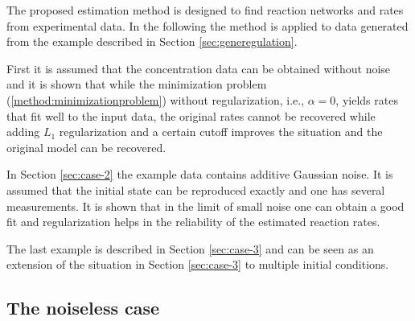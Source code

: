 \documentclass[oneside, abstracton, titlepage]{scrartcl}
\begin{document}
	The proposed estimation method is designed to find reaction networks and rates from experimental data. In the following the method is applied to data generated from the example described in Section \ref{sec:generegulation}.

	First it is assumed that the concentration data can be obtained without noise and it is shown that while the minimization problem (\ref{method:minimizationproblem}) without regularization, i.e., $\alpha=0$, yields rates that fit well to the input data, the original rates cannot be recovered while adding $L_1$ regularization and a certain cutoff improves the situation and the original model can be recovered.
	
	In Section \ref{sec:case-2} the example data contains additive Gaussian noise. It is assumed that the initial state can be reproduced exactly and one has several measurements. It is shown that in the limit of small noise one can obtain a good fit and regularization helps in the reliability of the estimated reaction rates.
	
	The last example is described in Section \ref{sec:case-3} and can be seen as an extension of the situation in Section \ref{sec:case-3} to multiple initial conditions.
	

	\subsection{The noiseless case}\label{sec:case-1}
	
\end{document}
